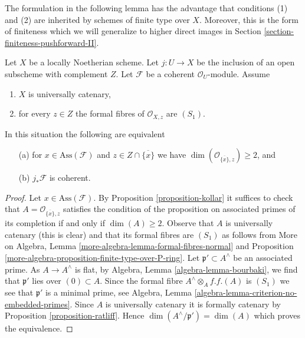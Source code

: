 \noindent
The formulation in the following lemma has the advantage that conditions
(1) and (2) are inherited by schemes of finite type over $X$.
Moreover, this is the form of finiteness which we will generalize
to higher direct images in Section \ref{section-finiteness-pushforward-II}.

\begin{lemma}
\label{lemma-finiteness-pushforward-general}
Let $X$ be a locally Noetherian scheme.
Let $j : U \to X$ be the inclusion of an
open subscheme with complement $Z$. Let $\mathcal{F}$ be a coherent
$\mathcal{O}_U$-module. Assume
\begin{enumerate}
\item $X$ is universally catenary,
\item for every $z \in Z$ the formal fibres of $\mathcal{O}_{X, z}$
are $(S_1)$.
\end{enumerate}
In this situation the following are equivalent
\begin{enumerate}
\item[(a)] for $x \in \text{Ass}(\mathcal{F})$ and
$z \in Z \cap \overline{\{x\}}$ we have
$\dim(\mathcal{O}_{\overline{\{x\}}, z}) \geq 2$, and
\item[(b)] $j_*\mathcal{F}$ is coherent.
\end{enumerate}
\end{lemma}

\begin{proof}
Let $x \in \text{Ass}(\mathcal{F})$. By Proposition \ref{proposition-kollar}
it suffices to check that $A = \mathcal{O}_{\overline{\{x\}}, z}$ satisfies
the condition of the proposition on associated primes of its completion
if and only if $\dim(A) \geq 2$.
Observe that $A$ is universally catenary (this is clear)
and that its formal fibres are $(S_1)$ as follows from
More on Algebra, Lemma \ref{more-algebra-lemma-formal-fibres-normal} and
Proposition \ref{more-algebra-proposition-finite-type-over-P-ring}.
Let $\mathfrak p' \subset A^\wedge$ be an associated prime.
As $A \to A^\wedge$ is flat,
by Algebra, Lemma \ref{algebra-lemma-bourbaki},
we find that $\mathfrak p'$ lies over $(0) \subset A$.
Since the formal fibre $A^\wedge \otimes_A f.f.(A)$
is $(S_1)$ we see that $\mathfrak p'$ is a minimal prime, see
Algebra, Lemma \ref{algebra-lemma-criterion-no-embedded-primes}.
Since $A$ is universally catenary it is formally catenary
by Proposition \ref{proposition-ratliff}.
Hence $\dim(A^\wedge/\mathfrak p') = \dim(A)$ which
proves the equivalence.
\end{proof}






